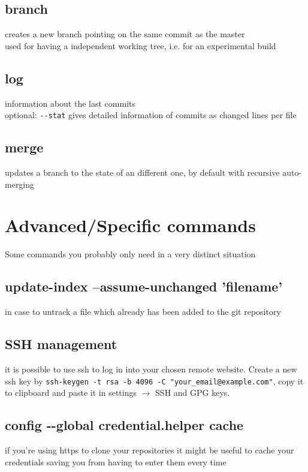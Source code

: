 \subsection*{branch}
creates a new branch pointing on the same commit as the master\\
used for having a independent working tree, i.e. for an experimental build\\

\subsection*{log}
information about the last commits \\
optional: \texttt{-{}-stat} gives detailed information of commits as changed lines per file \\

\subsection*{merge}
updates a branch to the state of an different one, by default with recursive auto-merging\\


\section*{Advanced/Specific commands}
Some commands you probably only need in a very distinct situation\\
\subsection*{update-index –assume-unchanged 'filename'}
in case to untrack a file which already has been added to the git repository\\

\subsection*{SSH management}
it is possible to use ssh to log in into your chosen remote website. Create a new ssh key by \texttt{ssh-keygen -t rsa -b 4096 -C "your\_email@example.com"}, copy it to clipboard and paste it in settings $\rightarrow$ SSH and GPG keys.\\

\subsection*{config -{}-global credential.helper cache}
if you're using https to clone your repositories it might be useful to cache your credentials saving you from having to enter them every time

